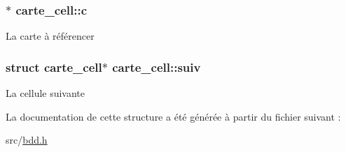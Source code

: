 \subsubsection[{\texorpdfstring{c}{c}}]{$\ast$ carte\+\_\+cell\+::c}\hypertarget{structcarte__cell_a2c4496b232d881213e41fe630c3843bb}{}\label{structcarte__cell_a2c4496b232d881213e41fe630c3843bb}
La carte à référencer 
\subsubsection[{\texorpdfstring{suiv}{suiv}}]{\setlength{\rightskip}{0pt plus 5cm}struct {\bf carte\+\_\+cell}$\ast$ carte\+\_\+cell\+::suiv}\hypertarget{structcarte__cell_aa9b3e04e481fb482711d5d66e4e45924}{}\label{structcarte__cell_aa9b3e04e481fb482711d5d66e4e45924}
La cellule suivante 

La documentation de cette structure a été générée à partir du fichier suivant \+:\begin{DoxyCompactItemize}
\item 
src/\hyperlink{bdd_8h}{bdd.\+h}\end{DoxyCompactItemize}
